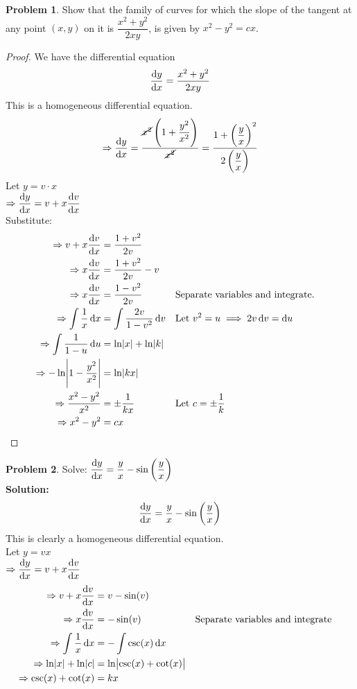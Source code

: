 \documentclass[14]{article}
\theoremstyle{definition}
\newtheorem{prob}{Problem}
\theoremstyle{case}
\begin{document}
\begin{prob}
Show that the family of curves for which the slope of the tangent at any point $(x, y)$ on it is $\dfrac{x^2 + y ^2}{2xy}$, is given by $x^2 - y^2 = cx$.\\
\begin{proof}
We have the differential equation
\[\dfrac{\dif y}{\dif x} = \dfrac{x^2 + y^2}{2xy}\]
This is a homogeneous differential equation.\\
\[\Rightarrow \dfrac{\dif y}{\dif x} = \dfrac{\cancel{x^2} \left(1 + \dfrac{y^2}{x^2}\right)}{\cancel{x^2}} = \dfrac{1 + \left(\dfrac{y}{x}\right)^2}{2\left(\dfrac{y}{x}\right)}\]
Let $y = v \cdot x$\\
$\Rightarrow \dfrac{\dif y}{\dif x} = v + x \dfrac{\dif v}{\dif x}$\\
Substitute:
\begin{align*}
\Rightarrow v + x \dfrac{\dif v}{\dif x} &= \dfrac{1+v^2}{2v}\\
\Rightarrow x \dfrac{\dif v}{\dif x} &= \dfrac{1+v^2}{2v} - v\\
\Rightarrow x \dfrac{\dif v}{\dif x} &= \dfrac{1-v^2}{2v} && \text{Separate variables and integrate.}\\
\Rightarrow \int \dfrac{1}{x}\dif x &= \int \dfrac{2v}{1-v^2}\dif v && \text{Let } v^2 = u \implies 2v \dif v = \dif u\\
\Rightarrow \int\dfrac{1}{1 - u} \dif u &= \ln\abs{x} + \ln\abs{k}\\
\Rightarrow -\ln\abs{1-\dfrac{y^2}{x^2}} &= \ln\abs{kx}\\
\Rightarrow \dfrac{x^2 - y^2}{x^2} &= \pm \dfrac1{kx} && \text{Let } c = \pm \dfrac1{k}\\
\Rightarrow x^2 - y^2 &= cx
\end{align*}
\end{proof}
\end{prob}
\pagebreak
\begin{prob}
Solve: $\dfrac{\dif y}{\dif x} = \dfrac{y}{x} - \sin\left(\dfrac{y}{x}\right)$\\
\textbf{Solution:}\\
\[\dfrac{\dif y}{\dif x} = \dfrac{y}{x} - \sin\left(\dfrac{y}{x}\right)\]
This is clearly a homogeneous differential equation.\\
Let $y = vx$\\
$\Rightarrow \dfrac{\dif y}{\dif x} = v + x \dfrac{\dif v}{\dif x}$
\begin{align*}
\Rightarrow v + x \dfrac{\dif v}{\dif x} &= v - \sin(v)\\
\Rightarrow x \dfrac{\dif v}{\dif x} &= -\sin(v) && \text{Separate variables and integrate}\\
\Rightarrow \int \dfrac1{x} \dif x &= -\int\csc(x) \dif x\\
\Rightarrow \ln\abs{x} + \ln\abs{c} &= \ln\abs{\csc(x) + \cot(x)}\\
\Rightarrow \csc(x) + \cot(x) &= kx
\end{align*}
\end{prob}
\end{document}
